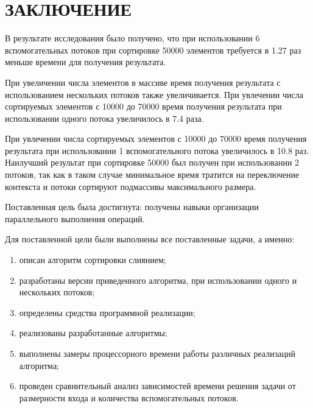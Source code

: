 \chapter*{\hfill{\centering  ЗАКЛЮЧЕНИЕ}\hfill}

В результате исследования было получено, что при использовании 6 вспомогательных потоков при сортировке 50000 элементов требуется в 1.27 раз меньше времени для получения результата. 

При увеличении числа элементов в массиве
время получения результата с использованием нескольких потоков также увеличивается. При увлечении числа сортируемых элементов с 10000 до 70000 время получения результата при использовании одного потока увеличилось в 7.4 раза.

При увлечении числа сортируемых элементов с 10000 до 70000 время получения результата при использовании 1 вспомогательного потока увеличилось в 10.8 раз. Наилучший результат при сортировке 50000 был получен при использовании 2 потоков, так как в таком случае минимальное время тратится на переключение контекста и потоки сортируют подмассивы максимального размера.

Поставленная цель была достигнута: получены навыки организации параллельного выполнения операций.

Для поставленной цели были выполнены все поставленные задачи, а именно:
\begin{enumerate}
	\item описан алгоритм сортировки слиянием;
	\item разработаны версии приведенного алгоритма, при использовании одного и нескольких потоков;
	\item определены средства программной реализации;
	\item реализованы разработанные алгоритмы;
	\item выполнены замеры процессорного времени работы различных реализаций алгоритма;
	\item проведен сравнительный анализ зависимостей времени решения задачи от размерности входа и количества вспомогательных потоков.
\end{enumerate}


